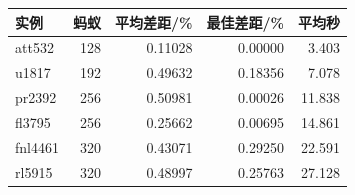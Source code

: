 \begin{tabular}{@{}lrrrr@{}}
\toprule
实例 & 蚂蚁 & 平均差距/\% & 最佳差距/\% & 平均秒 \\ \midrule
att532 & 128 & 0.11028 & 0.00000 & 3.403 \\
u1817 & 192 & 0.49632 & 0.18356 & 7.078 \\
pr2392 & 256 & 0.50981 & 0.00026 & 11.838 \\
fl3795 & 256 & 0.25662 & 0.00695 & 14.861 \\
fnl4461 & 320 & 0.43071 & 0.29250 & 22.591 \\
rl5915 & 320 & 0.48997 & 0.25763 & 27.128 \\
\bottomrule
\end{tabular}
